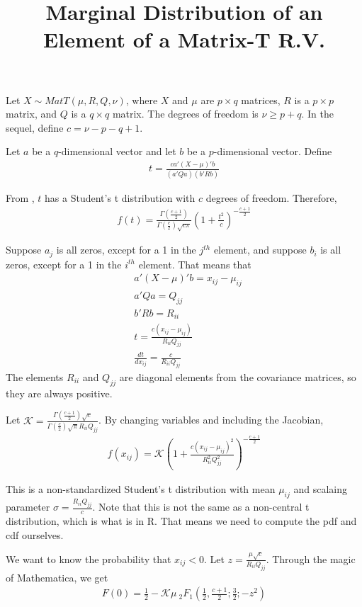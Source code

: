 \documentclass[letter,11pt]{article}
\title{Marginal Distribution of an Element of a Matrix-T R.V.}
\newcommand{\K}{\mathcal{K}}
\begin{document}
\maketitle
Let $X\sim MatT(\mu,R,Q,\nu)$, where $X$ and $\mu$ are $p\times q$
matrices, $R$ is a $p \times p$ matrix, and $Q$ is a $q \times q$
matrix.  The degrees of freedom is $\nu\ge p+q$. In the sequel, define
$c=\nu-p-q+1$.

Let $a$ be a $q$-dimensional vector and let $b$ be a  $p$-dimensional
vector.  Define
\begin{align}
  \label{eq:1}
  t=\frac{ca'(X-\mu)'b}{(a'Qa)(b'Rb)}
\end{align}

From \citet[p. 116]{KotzNadarajah2004}, $t$ has a Student's t
distribution with $c$ degrees of freedom.  Therefore,
\begin{align}
  \label{eq:2}
  f(t)=\frac{\Gamma(\frac{c+1}{2})}{\Gamma(\frac{c}{2})\sqrt{c\pi}}\left(1+\frac{t^2}{c}\right)^{-\frac{c+1}{2}}
\end{align}

Suppose $a_j$ is all zeros, except for a 1 in the $j^{th}$ element,
and suppose $b_i$ is all zeros, except for a 1 in the $i^{th}$
element.  That means that
\begin{align}
  \label{eq:3}
&a'(X-\mu)'b=x_{ij}-\mu_{ij}\\
&a'Qa=Q_{jj}\\
&b'Rb=R_{ii}\\
&t=\frac{c(x_{ij}-\mu_{ij})}{R_{ii}Q_{jj}} \\
&\frac{dt}{dx_{ij}}=\frac{c}{R_{ii}Q_{jj}}
\end{align}
The elements $R_{ii}$ and $Q_{jj}$ are diagonal elements from the
covariance matrices, so they are always positive.

Let
$\K=\displaystyle\frac{\Gamma(\frac{c+1}{2})\sqrt{c}}{\Gamma(\frac{c}{2})\sqrt{\pi}R_{ii}Q_{jj}}$.
By changing variables and including the Jacobian,
\begin{align}
  \label{eq:4}
  f(x_{ij})=\K\left(1+\frac{c(x_{ij}-\mu_{ij})^2}{R_{ii}^2Q_{jj}^2}\right)^{-\frac{c+1}{2}}
\end{align}

This is a non-standardized Student's t distribution with mean
$\mu_{ij}$ and scalaing parameter
$\sigma=\displaystyle\frac{R_{ii}Q_{jj}}{c}$.  Note that this is not
the same as a non-central t distribution, which is what is in R.  That
means we need to compute the pdf and cdf ourselves.

We want to know the probability that $x_{ij}<0$.  Let
$z=\displaystyle\frac{\mu\sqrt{c}}{R_{ii}Q_{jj}}$. Through the magic of
Mathematica, we get
\begin{align}
  \label{eq:5}
  F(0)=\frac{1}{2}-\K\mu~_2F_1\left(\frac{1}{2},\frac{c+1}{2};\frac{3}{2}; -z^2\right)
\end{align}
\end{document}
